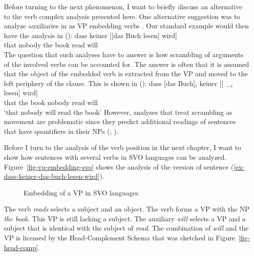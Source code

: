 Before turning to the next phenomenon, I want to briefly discuss an alternative to the verb complex
analysis presented here. One alternative suggestion was to analyze auxiliaries in  as VP
embedding verbs \citep{Wurmbrand2003b}. Our standard example would then have the analysis in ():
\ea
\gll dass keiner [[das Buch lesen] wird]\\
     that nobody \hphantom{[[}the book read will\\
\z
The question that such analyses have to answer is how scrambling of arguments of the involved verbs
can be accounted for. The answer is often that it is assumed that the object of the embedded verb is
extracted from the VP and moved to the left periphery of the clause. This is shown in ():
\ea
\gll dass [das Buch]$_i$ keiner [[ \_$_i$ lesen] wird]\\
     that \spacebr{}the book nobody {} {} read will\\
\glt `that nobody will read the book'
\z
However, analyses that treat scrambling as movement are problematic since they predict additional
readings of sentences that have quantifiers in their NPs (\citealp[]{Kiss2001a};
\citealp[Section~2.6]{Fanselow2001a}).


Before I turn to the analysis of the verb position in the next chapter, I want to show how sentences with several verbs
\label{page-English-Aux-VPs}
in SVO languages can be analyzed. Figure~\vref{fig-vp-embedding-svo} shows the analysis of the  version of sentence
(\ref{ex-dass-keiner-das-buch-lesen-wird}).
\begin{figure}
\caption{\label{fig-vp-embedding-svo}Embedding of a VP in SVO languages}
\end{figure}
The verb \emph{reads} selects a subject and an object. The verb forms a VP with the NP \emph{the
  book}. This VP is still lacking a subject. The auxiliary \emph{will} selects a VP and a subject
that is identical with the subject of \emph{read}. The combination of \emph{will} and the VP is
licensed by the Head-Complement Schema that was sketched in Figure~\vref{fig-head-comp}.

